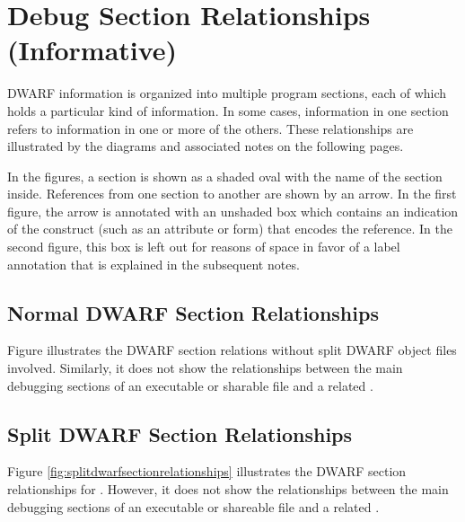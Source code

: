 \chapter{Debug Section Relationships (Informative)}
\label{app:debugsectionrelationshipsinformative}
DWARF information is organized into multiple program sections, 
each of which holds a particular kind of information. In some 
cases, information in one section refers to information in one 
or more of the others. These relationships are illustrated by 
the diagrams and associated notes on the following pages.

\bb
In the figures, a section is shown as a shaded oval with the
name of the section inside. References from one section to
another are shown by an arrow. In the first figure, the arrow
is annotated with an unshaded box which contains an indication
of the construct (such as an attribute or form) that encodes
the reference. In the second figure, this box is left out
for reasons of space in favor of a label annotation that is
explained in the subsequent notes.
\eb

\section{Normal DWARF Section Relationships}
Figure  illustrates
the DWARF section relations without split DWARF object files
involved. Similarly, it does not show the 
relationships between the main debugging sections of an executable
or sharable file and a related .

\section{Split DWARF Section Relationships}
Figure \ref{fig:splitdwarfsectionrelationships} illustrates
the DWARF section relationships for .
However, it does not show the 
relationships between the main debugging sections of an executable
or shareable file and a related .

